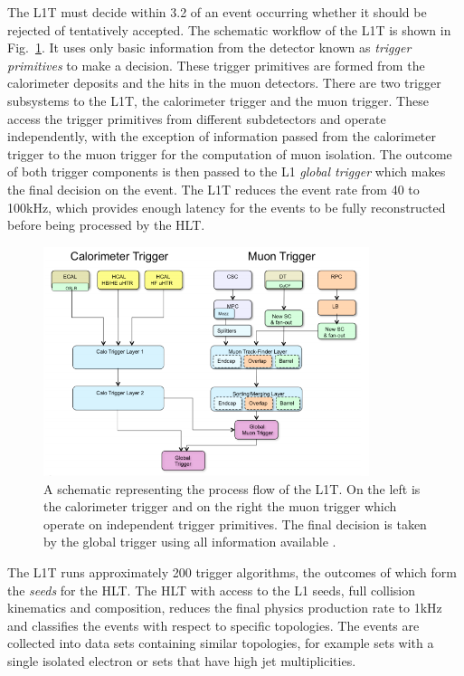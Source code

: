 The L1T must decide within 3.2\us{} of an event occurring whether it should be rejected of tentatively accepted.
The schematic workflow of the L1T is shown in Fig.~\ref{fig:CMSL1T}.
It uses only basic information from the detector known as \textit{trigger primitives} to make a decision.
These trigger primitives are formed from the calorimeter deposits and the hits in the muon detectors.
There are two trigger subsystems to the L1T, the calorimeter trigger and the muon trigger.
These access the trigger primitives from different subdetectors and operate independently, with the exception of information passed from the calorimeter trigger to the muon trigger for the computation of muon isolation.
The outcome of both trigger components is then passed to the L1 \textit{global trigger} which makes the final decision on the event.
The L1T reduces the event rate from 40\MHz{} to 100\unit{kHz}, which provides enough latency for the events to be fully reconstructed before being processed by the HLT. 
\begin{figure}[htpb]
	\centering
	\includegraphics[width=0.85\textwidth]{Figures/CMSL1TUpgrade}
	\caption[A schematic representing the process flow of the L1T. On the left is the calorimeter trigger and on the right the muon trigger which operate on independent trigger primitives. The final decision is taken by the global trigger using all information available.]{A schematic representing the process flow of the L1T. On the left is the calorimeter trigger and on the right the muon trigger which operate on independent trigger primitives. The final decision is taken by the global trigger using all information available \cite{CMS:L1TUpgradeTDR}.}
	\label{fig:CMSL1T}
\end{figure}

The L1T runs approximately 200 trigger algorithms, the outcomes of which form the \textit{seeds} for the HLT. 
The HLT with access to the L1 seeds, full collision kinematics and composition, reduces the final physics production rate to 1\unit{kHz} and classifies the events with respect to specific topologies.
The events are collected into data sets containing similar topologies, for example sets with a single isolated electron or sets that have high jet multiplicities.

